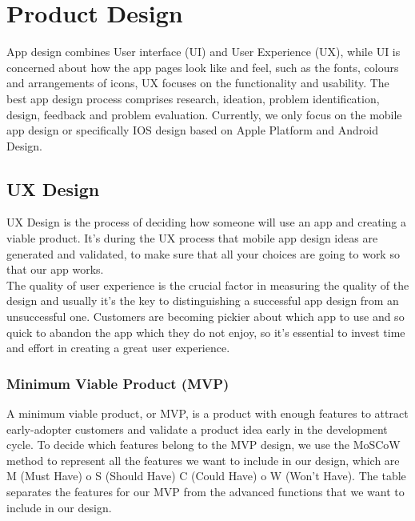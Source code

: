 
\chapter{Product Design} %

\label{Chapter2} %

App design combines User interface (UI) and User Experience (UX), while UI is concerned about how the app pages look like and feel, such as the fonts, colours and arrangements of icons, UX focuses on the functionality and usability. The best app design process comprises research, 
ideation, problem identification, design, feedback and problem evaluation. Currently, we only focus on the mobile app design or specifically IOS design based on Apple Platform and Android Design. 
\section{UX Design}
UX Design is the process of deciding how someone will use an app and creating a viable product. It’s during the UX process that mobile app design ideas are generated and validated, to make sure that all your choices are going to work so that our app works. 
\\The quality of user experience is the crucial factor in measuring the quality of the design and usually it's the key to distinguishing a successful app design from an unsuccessful one. 
Customers are becoming pickier about which app to use and so quick to abandon the app which they do not enjoy, so it's essential to invest time and effort in creating a great user experience.
\subsection{Minimum Viable Product (MVP)}
A minimum viable product, or MVP,  is a product with enough features to attract early-adopter customers and validate a product idea early in the development cycle. To decide which features belong to the MVP design, we use the MoSCoW method to represent all the features we want to include in our design, which are M (Must Have) o S (Should Have) C (Could Have) o W (Won’t Have). 
The table separates the features for our MVP from the advanced functions that we want to include in our design.

